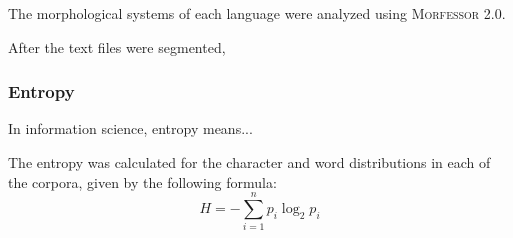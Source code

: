 \documentclass[12pt,a4paper]{article}
\numberwithin{figure}{section}
\numberwithin{table}{section}
\numberwithin{definition}{section}
\begin{document}
The morphological systems of each language were analyzed using \textsc{Morfessor 2.0}.  




After the text files were segmented, 

\subsubsection{Entropy}
\label{ssec:entropy}

In information science, entropy means... 


The entropy was calculated for the character and word distributions in each of the corpora, given by the following formula: \[H = -\sum_{i=1}^{n}p_{i}\log_{2}p_{i}\]



\end{document}
